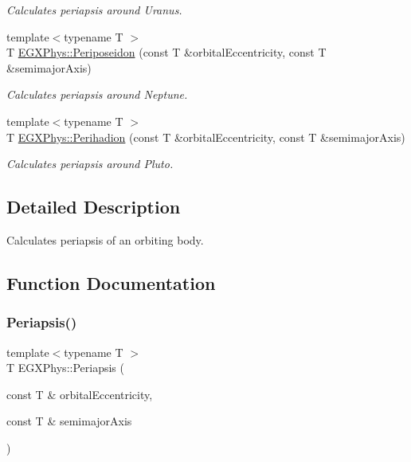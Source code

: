 \begin{DoxyCompactItemize}
\begin{DoxyCompactList}\small\item\em Calculates periapsis around Uranus. \end{DoxyCompactList}\item 
{\footnotesize template$<$typename T $>$ }\\T \hyperlink{group___periapsis_ga237e7af3794202c67e65f64f4c8abc2a}{E\+G\+X\+Phys\+::\+Periposeidon} (const T \&orbital\+Eccentricity, const T \&semimajor\+Axis)
\begin{DoxyCompactList}\small\item\em Calculates periapsis around Neptune. \end{DoxyCompactList}\item 
{\footnotesize template$<$typename T $>$ }\\T \hyperlink{group___periapsis_gafb16e46e55078b38604eef0d7c7c40c4}{E\+G\+X\+Phys\+::\+Perihadion} (const T \&orbital\+Eccentricity, const T \&semimajor\+Axis)
\begin{DoxyCompactList}\small\item\em Calculates periapsis around Pluto. \end{DoxyCompactList}\end{DoxyCompactItemize}


\subsection{Detailed Description}
Calculates periapsis of an orbiting body. 

\subsection{Function Documentation}
\mbox{\label{group___periapsis_ga4414ac75539371ec874a3d25cad6c9fe}} 
\subsubsection{\texorpdfstring{Periapsis()}{Periapsis()}}
{\footnotesize\ttfamily template$<$typename T $>$ \\
T E\+G\+X\+Phys\+::\+Periapsis (\begin{DoxyParamCaption}\item[{const T \&}]{orbital\+Eccentricity,  }\item[{const T \&}]{semimajor\+Axis }\end{DoxyParamCaption})}



